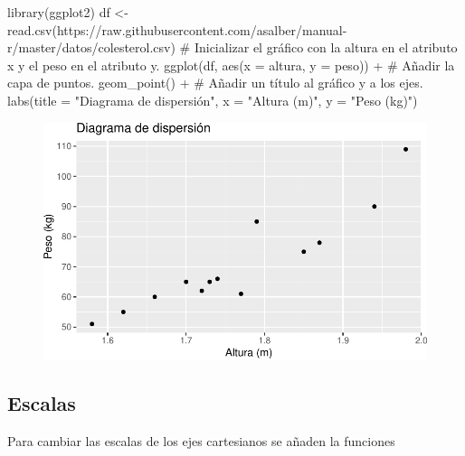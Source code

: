 \documentclass[
  a4paper,
]{scrreport}
\newenvironment{Shaded}{\begin{snugshade}}{\end{snugshade}}
\newcommand{\AttributeTok}[1]{\textcolor[rgb]{0.40,0.45,0.13}{#1}}
\newcommand{\CommentTok}[1]{\textcolor[rgb]{0.37,0.37,0.37}{#1}}
\newcommand{\FunctionTok}[1]{\textcolor[rgb]{0.28,0.35,0.67}{#1}}
\newcommand{\NormalTok}[1]{\textcolor[rgb]{0.00,0.23,0.31}{#1}}
\newcommand{\OtherTok}[1]{\textcolor[rgb]{0.00,0.23,0.31}{#1}}
\newcommand{\SpecialCharTok}[1]{\textcolor[rgb]{0.37,0.37,0.37}{#1}}
\newcommand{\StringTok}[1]{\textcolor[rgb]{0.13,0.47,0.30}{#1}}
\theoremstyle{definition}
\theoremstyle{definition}
\theoremstyle{remark}
\begin{document}
\begin{Shaded}
\begin{Highlighting}[]
\FunctionTok{library}\NormalTok{(ggplot2)}
\NormalTok{df }\OtherTok{\textless{}{-}} \FunctionTok{read.csv}\NormalTok{(}\StringTok{\textquotesingle{}https://raw.githubusercontent.com/asalber/manual{-}r/master/datos/colesterol.csv\textquotesingle{}}\NormalTok{)}
\CommentTok{\# Inicializar el gráfico con la altura en el atributo x y el peso en el atributo y.}
\FunctionTok{ggplot}\NormalTok{(df, }\FunctionTok{aes}\NormalTok{(}\AttributeTok{x =}\NormalTok{ altura, }\AttributeTok{y =}\NormalTok{ peso)) }\SpecialCharTok{+}
\CommentTok{\# Añadir la capa de puntos.}
    \FunctionTok{geom\_point}\NormalTok{() }\SpecialCharTok{+}
\CommentTok{\# Añadir un título al gráfico y a los ejes.}
    \FunctionTok{labs}\NormalTok{(}\AttributeTok{title =} \StringTok{"Diagrama de dispersión"}\NormalTok{, }\AttributeTok{x =} \StringTok{"Altura (m)"}\NormalTok{, }\AttributeTok{y =} \StringTok{"Peso (kg)"}\NormalTok{)}
\end{Highlighting}
\end{Shaded}

\begin{figure}[H]

{\centering \includegraphics{./07-graficos_files/figure-pdf/unnamed-chunk-28-1.pdf}

}

\end{figure}

\hypertarget{escalas}{%
\subsection{Escalas}\label{escalas}}

Para cambiar las escalas de los ejes cartesianos se añaden la funciones
\end{document}
